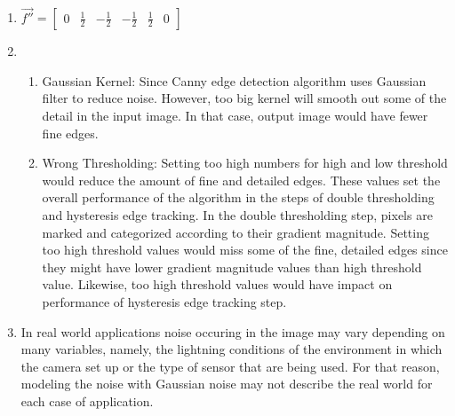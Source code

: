 \documentclass{article}
\begin{document}
\begin{enumerate}
	\item $ \vec{f''} = \begin{bmatrix}  0 & \frac{1}{2} & - \frac{1}{2} &
	-\frac{1}{2} & \frac{1}{2} & 0 \end{bmatrix}$
	\item %
	\begin{enumerate}
		\item Gaussian Kernel: Since Canny edge detection algorithm uses Gaussian
		filter to reduce noise. However, too big kernel will smooth out some of the
		detail in the input image. In that case, output image would have fewer fine
		edges.
		\item Wrong Thresholding: Setting too high numbers for high and low threshold
		would reduce the amount of fine and detailed edges. These values set the
		overall performance of the algorithm in the steps of double thresholding and
		hysteresis edge tracking. 
		In the double thresholding step, pixels are marked and categorized according
		to their gradient magnitude. Setting too high threshold values would miss some
		of the fine, detailed edges since they might have lower gradient magnitude
		values than high threshold value. Likewise, too high threshold
		values would have impact on performance of hysteresis edge tracking step.
	\end{enumerate}
	\item In real world applications noise occuring in the image may vary
	depending on many variables, namely, the lightning conditions of the
	environment in which the camera set up or the type of sensor that are being
	used. For that reason, modeling the noise with Gaussian noise may not describe
	the real world for each case of application. 

\end{enumerate}
\end{document}
